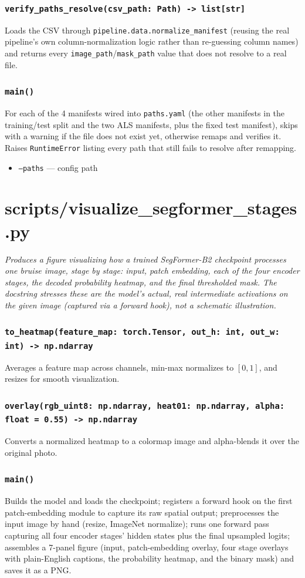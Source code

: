 \documentclass[11pt]{article}
\newcommand{\role}[1]{\par\noindent\textit{#1}\par\vspace{0.5em}}
\newcommand{\func}[1]{\subsubsection*{\texttt{#1}}}
\newcommand{\cliarg}[2]{\item \texttt{#1} --- #2}
\begin{document}
\func{verify\_paths\_resolve(csv\_path: Path) -> list[str]}
Loads the CSV through \texttt{pipeline.data.normalize\_manifest} (reusing the
real pipeline's own column-normalization logic rather than re-guessing column
names) and returns every \texttt{image\_path}/\texttt{mask\_path} value that
does not resolve to a real file.

\func{main()}
For each of the 4 manifests wired into \texttt{paths.yaml} (the other manifests
in the training/test split and the two ALS manifests, plus the fixed test
manifest), skips with a warning if the file does not exist yet, otherwise
remaps and verifies it. Raises \texttt{RuntimeError} listing every path that
still fails to resolve after remapping.

\begin{itemize}[nosep]
\cliarg{--paths}{config path}
\end{itemize}

\section{scripts/visualize\_segformer\_stages.py}
\role{Produces a figure visualizing how a trained SegFormer-B2 checkpoint
processes one bruise image, stage by stage: input, patch embedding, each of the
four encoder stages, the decoded probability heatmap, and the final thresholded
mask. The docstring stresses these are the model's actual, real intermediate
activations on the given image (captured via a forward hook), not a schematic
illustration.}

\func{to\_heatmap(feature\_map: torch.Tensor, out\_h: int, out\_w: int) -> np.ndarray}
Averages a feature map across channels, min-max normalizes to $[0,1]$, and
resizes for smooth visualization.

\func{overlay(rgb\_uint8: np.ndarray, heat01: np.ndarray, alpha: float = 0.55) -> np.ndarray}
Converts a normalized heatmap to a colormap image and alpha-blends it over the
original photo.

\func{main()}
Builds the model and loads the checkpoint; registers a forward hook on the
first patch-embedding module to capture its raw spatial output; preprocesses
the input image by hand (resize, ImageNet normalize); runs one forward pass
capturing all four encoder stages' hidden states plus the final upsampled
logits; assembles a 7-panel figure (input, patch-embedding overlay, four stage
overlays with plain-English captions, the probability heatmap, and the binary
mask) and saves it as a PNG.
\end{document}
